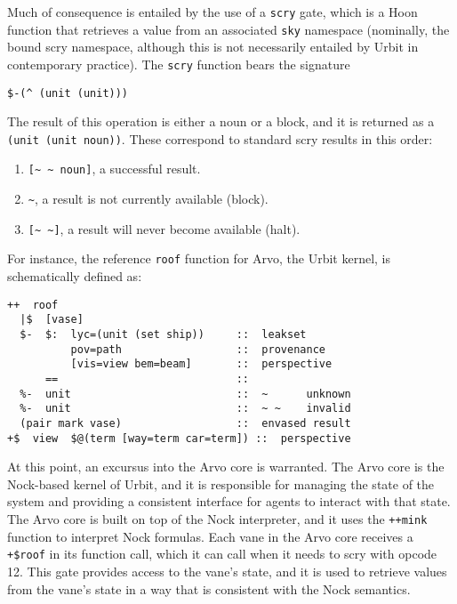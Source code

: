 \documentclass[twoside]{article}
\begin{document}
\sloppy
Much of consequence is entailed by the use of a \lstinline[style=inlinecode]{scry} gate, which is a Hoon function that retrieves a value from an associated \lstinline[style=inlinecode]{sky} namespace (nominally, the bound scry namespace, although this is not necessarily entailed by Urbit in contemporary practice).  The \lstinline[style=inlinecode]{scry} function bears the signature
\begin{lstlisting}[style=listingblock]
$-(^ (unit (unit)))
\end{lstlisting}

\noindent
The result of this operation is either a noun or a block, and it is returned as a \lstinline[style=inlinecode]{(unit (unit noun))}.  These correspond to standard scry results in this order:

\begin{enumerate}
  \item  \lstinline[style=inlinecode]{[~ ~ noun]}, a successful result.
  \item  \lstinline[style=inlinecode]{~}, a result is not currently available (block).
  \item  \lstinline[style=inlinecode]{[~ ~]}, a result will never become available (halt).
\end{enumerate}

For instance, the reference \texttt{roof} function for Arvo, the Urbit kernel, is schematically defined as:

\begin{lstlisting}[style=listingcode]
++  roof
  |$  [vase]
  $-  $:  lyc=(unit (set ship))     ::  leakset
          pov=path                  ::  provenance
          [vis=view bem=beam]       ::  perspective
      ==                            ::
  %-  unit                          ::  ~      unknown
  %-  unit                          ::  ~ ~    invalid
  (pair mark vase)                  ::  envased result
+$  view  $@(term [way=term car=term]) ::  perspective
\end{lstlisting}

At this point, an excursus into the Arvo core is warranted.  The Arvo core is the Nock-based kernel of Urbit, and it is responsible for managing the state of the system and providing a consistent interface for agents to interact with that state.  The Arvo core is built on top of the Nock interpreter, and it uses the \lstinline[style=inlinecode]{++mink} function to interpret Nock formulas.  Each vane in the Arvo core receives a \lstinline[style=inlinecode]{+$roof} in its function call, which it can call when it needs to scry with opcode 12.  This gate provides access to the vane's state, and it is used to retrieve values from the vane's state in a way that is consistent with the Nock semantics.
\end{document}
